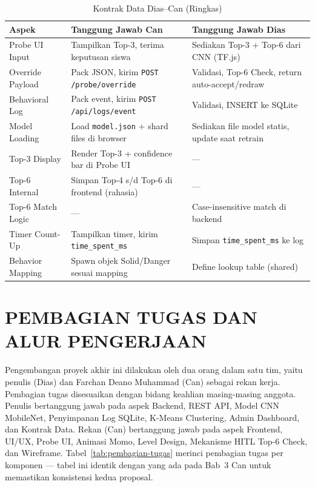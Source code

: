 \documentclass[12pt,a4paper,oneside,openany]{report}
\begin{document}
\begin{table}[H]
\centering
\caption{Kontrak Data Dias--Can (Ringkas)}
\label{tab:kontrak-data}
\begin{tabular}{|p{4cm}|p{4cm}|p{5cm}|}
\hline
\textbf{Aspek} & \textbf{Tanggung Jawab Can} & \textbf{Tanggung Jawab Dias} \\ \hline
Probe UI Input & Tampilkan Top-3, terima keputusan siswa & Sediakan Top-3 + Top-6 dari CNN (TF.js) \\ \hline
Override Payload & Pack JSON, kirim \texttt{POST /probe/override} & Validasi, Top-6 Check, return auto-accept/redraw \\ \hline
Behavioral Log & Pack event, kirim \texttt{POST /api/logs/event} & Validasi, INSERT ke SQLite \\ \hline
Model Loading & Load \texttt{model.json} + shard files di browser & Sediakan file model statis, update saat retrain \\ \hline
Top-3 Display & Render Top-3 + confidence bar di Probe UI & --- \\ \hline
Top-6 Internal & Simpan Top-4 s/d Top-6 di frontend (rahasia) & --- \\ \hline
Top-6 Match Logic & --- & Case-insensitive match di backend \\ \hline
Timer Count-Up & Tampilkan timer, kirim \texttt{time\_spent\_ms} & Simpan \texttt{time\_spent\_ms} ke log \\ \hline
Behavior Mapping & Spawn objek Solid/Danger sesuai mapping & Define lookup table (shared) \\ \hline
\end{tabular}
\end{table}

\section{PEMBAGIAN TUGAS DAN ALUR PENGERJAAN}
\label{sec:pembagian-tugas}

Pengembangan proyek akhir ini dilakukan oleh dua orang dalam satu tim, yaitu penulis (Dias) dan Farchan Deano Muhammad (Can) sebagai rekan kerja. Pembagian tugas disesuaikan dengan bidang keahlian masing-masing anggota. Penulis bertanggung jawab pada aspek Backend, REST API, Model CNN MobileNet, Penyimpanan Log SQLite, K-Means Clustering, Admin Dashboard, dan Kontrak Data. Rekan (Can) bertanggung jawab pada aspek Frontend, UI/UX, Probe UI, Animasi Momo, Level Design, Mekanisme HITL Top-6 Check, dan Wireframe. Tabel~\ref{tab:pembagian-tugas} merinci pembagian tugas per komponen --- tabel ini identik dengan yang ada pada Bab~3 Can untuk memastikan konsistensi kedua proposal.
\end{document}

